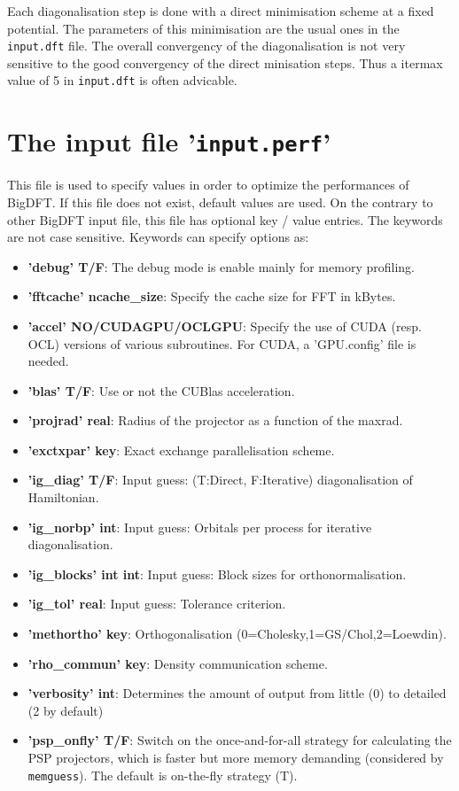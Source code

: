 \documentclass[a4paper,11pt]{report}
\begin{document}
Each diagonalisation step is done with a direct minimisation scheme at a fixed potential. The parameters of this minimisation are the usual ones in the \texttt{input.dft} file. The overall convergency of the diagonalisation is not very sensitive to the good convergency of the direct minisation steps. Thus a itermax value of 5 in \texttt{input.dft} is often advicable.

\section{The input file '\texttt{input.perf}'}
This file is used to specify values in order to optimize the performances of BigDFT. If this file
does not exist, default values are used. On the contrary to other BigDFT input file, this file has optional key / value entries. The keywords are not case sensitive. Keywords can specify options as:
\begin{itemize}
  \item  \textbf{'debug' T/F}: The debug mode is enable mainly for memory profiling.
  \item  \textbf{'fftcache' ncache\_size}: Specify the cache size for FFT in kBytes.
  \item  \textbf{'accel' NO/CUDAGPU/OCLGPU}: Specify the use of CUDA (resp. OCL) versions of various subroutines. For CUDA, a 'GPU.config' file is needed.
  \item  \textbf{'blas' T/F}:           Use or not the CUBlas acceleration.
  \item  \textbf{'projrad' real}:       Radius of the projector as a function of the maxrad.
  \item  \textbf{'exctxpar' key}:       Exact exchange parallelisation scheme.
  \item  \textbf{'ig\_diag' T/F}:       Input guess: (T:Direct, F:Iterative) diagonalisation of Hamiltonian.
  \item  \textbf{'ig\_norbp' int}:      Input guess: Orbitals per process for iterative diagonalisation.
  \item  \textbf{'ig\_blocks' int int}: Input guess: Block sizes for orthonormalisation.
  \item  \textbf{'ig\_tol' real}:       Input guess: Tolerance criterion.
  \item  \textbf{'methortho' key}:      Orthogonalisation (0=Cholesky,1=GS/Chol,2=Loewdin).
  \item  \textbf{'rho\_commun' key}:    Density communication scheme.
  \item  \textbf{'verbosity' int}:      Determines the amount of output from little (0) to detailed (2 by default)
  \item  \textbf{'psp\_onfly' T/F}:     Switch on the once-and-for-all strategy for calculating the PSP projectors, which
      is faster but more memory demanding (considered by \texttt{memguess}). The default is on-the-fly strategy (T).
\end{itemize}
\end{document}
